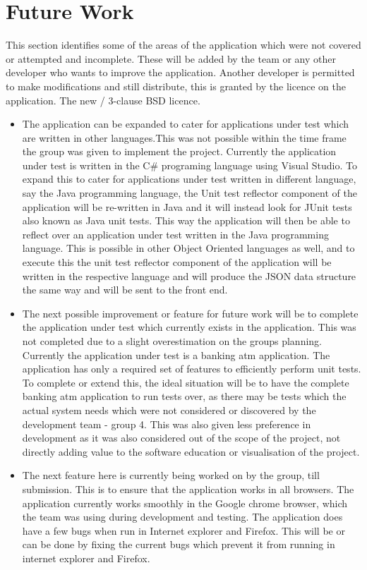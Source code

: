 \documentclass[a4paper,12pt]{Article}
\begin{document}
\section{Future Work}
This section identifies some of the areas of the application which were not covered or attempted and incomplete. These will be added by the team or any other developer who wants to improve the application. Another developer is permitted to make modifications and still distribute, this is granted by the licence on the application. The new / 3-clause BSD licence.
\begin{itemize}
\item The application can be expanded to cater for applications under test which are written in other languages.This was not possible within the time frame the group was given to implement the project. Currently the application under test is written in the C\# programing language using Visual Studio. To expand this to cater for applications under test written in different language, say the Java programming language, the Unit test reflector component of the application will be re-written in Java and it will instead look for JUnit tests also known as Java unit tests. This way the application will then be able to reflect over an application under test written in the Java programming language. This is possible in other Object Oriented languages as well, and to execute this the unit test reflector component of the application will be written in the respective language and will produce the JSON data structure the same way and will be sent to the front end.
\item The next possible improvement or feature for future work will be to complete the application under test which currently exists in the application. This was not completed due to a slight overestimation on the groups planning. Currently the application under test is a banking atm application. The application has only a required set of features to efficiently perform unit tests. To complete or extend this, the ideal situation will be to have the complete banking atm application to run tests over, as there may be tests which the actual system needs which were not considered or discovered by the development team - group 4. This was also given less preference in development as it was also considered out of the scope of the project, not directly adding value to the software education or visualisation of the project.
\item The next feature here is currently being worked on by the group, till submission. This is to ensure that the application works in all browsers. The application currently works smoothly in the Google chrome browser, which the team was using during development and testing. The application does have a few bugs when run in Internet explorer and Firefox. This will be or can be done by fixing the current bugs which prevent it from running in internet explorer and Firefox.

\end{itemize}
\end{document}
